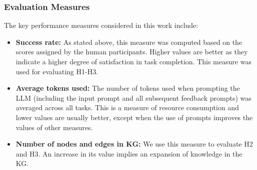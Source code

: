 \subsubsection{Evaluation Measures}
The key performance measures considered in this work include:
\begin{itemize}
    \vspace{-1em}
    \item \textbf{Success rate:} As stated above, this measure was computed based on the scores assigned by the human participants. Higher values are better as they indicate a higher degree of satisfaction in task completion.  This measure was used for evaluating H1-H3. 

    \item \textbf{Average tokens used:} The number of tokens used when prompting the LLM (including the input prompt and all subsequent feedback prompts) was averaged across all tasks. This is a measure of resource consumption and lower values are usually better, except when the use of prompts improves the values of other measures. %
    
    \item \textbf{Number of nodes and edges in KG:} We use this measure to evaluate H2 and H3. An increase in its value implies an expansion of knowledge in the KG.
    
    

\end{itemize}
